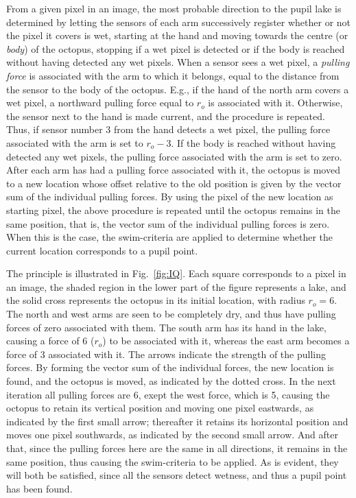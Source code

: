 From a given pixel in an image, the most probable direction to the
pupil lake is determined by letting the sensors of each arm
successively register whether or not the pixel it covers is wet,
starting at the hand and moving towards the centre (or {\em body\/})
of the octopus, stopping if a wet pixel is detected or if the body is
reached without having detected any wet pixels.  When a sensor sees a
wet pixel, a {\em pulling force\/} is associated with the arm to which
it belongs, equal to the distance from the sensor to the body of the
octopus.  E.g., if the hand of the north arm covers a wet pixel, a
northward pulling force equal to $r_{o}$ is associated with it.
Otherwise, the sensor next to the hand is made current, and the
procedure is repeated.  Thus, if sensor number 3 from the hand detects
a wet pixel, the pulling force associated with the arm is set to
$r_{o}-3$.  If the body is reached without having detected any wet
pixels, the pulling force associated with the arm is set to zero.
After each arm has had a pulling force associated with it, the octopus
is moved to a new location whose offset relative to the old position
is given by the vector sum of the individual pulling forces.  By using
the pixel of the new location as starting pixel, the above procedure
is repeated until the octopus remains in the same position, that is,
the vector sum of the individual pulling forces is zero.  When this is
the case, the swim-criteria are applied to determine whether the
current location corresponds to a pupil point.


The principle is illustrated in Fig.~\ref{fig:IQ}.  Each square
corresponds to a pixel in an image, the shaded region in the lower
part of the figure represents a lake, and the solid cross represents
the octopus in its initial location, with radius $r_{o}=6$.  The north
and west arms are seen to be completely dry, and thus have pulling
forces of zero associated with them.  The south arm has its hand in
the lake, causing a force of 6 ($r_{o}$) to be associated with it,
whereas the east arm becomes a force of 3 associated with it.  The
arrows indicate the strength of the pulling forces.  By forming the
vector sum of the individual forces, the new location is found, and
the octopus is moved, as indicated by the dotted cross.  In the next
iteration all pulling forces are 6, exept the west force, which is 5,
causing the octopus to retain its vertical position and moving one
pixel eastwards, as indicated by the first small arrow; thereafter it
retains its horizontal position and moves one pixel southwards, as
indicated by the second small arrow.  And after that, since the
pulling forces here are the same in all directions, it remains in the
same position, thus causing the swim-criteria to be applied.  As is
evident, they will both be satisfied, since all the sensors detect
wetness, and thus a pupil point has been found.

